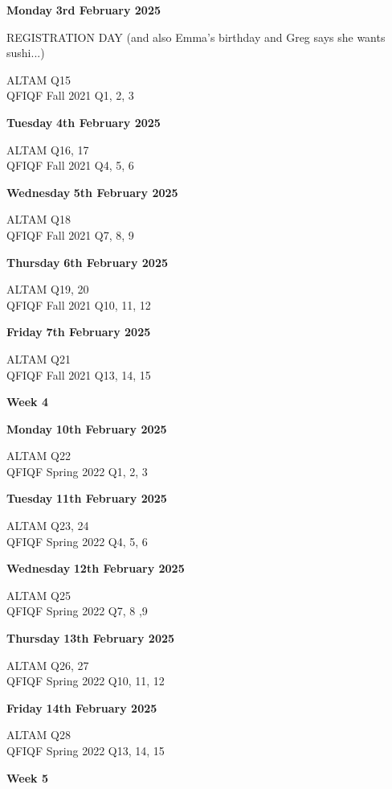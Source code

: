 \documentclass[hidelinks, 12pt]{article}
\theoremstyle{mydefstyle}
\theoremstyle{mythmstyle}
\begin{document}
\textbf{Monday} \hfill \textbf{3rd February 2025}

REGISTRATION DAY (and also Emma's birthday and Greg says she wants sushi...)

ALTAM Q15 \\
QFIQF Fall 2021 Q1, 2, 3

\textbf{Tuesday} \hfill \textbf{4th February 2025}

ALTAM Q16, 17 \\
QFIQF Fall 2021 Q4, 5, 6

\textbf{Wednesday} \hfill \textbf{5th February 2025}

ALTAM Q18 \\
QFIQF Fall 2021 Q7, 8, 9

\textbf{Thursday} \hfill \textbf{6th February 2025}

ALTAM Q19, 20 \\
QFIQF Fall 2021 Q10, 11, 12

\textbf{Friday} \hfill \textbf{7th February 2025}

ALTAM Q21 \\
QFIQF Fall 2021 Q13, 14, 15

\begin{center}
\textbf{Week 4}
\end{center}

\textbf{Monday} \hfill \textbf{10th February 2025}

ALTAM Q22 \\
QFIQF Spring 2022 Q1, 2, 3

\textbf{Tuesday} \hfill \textbf{11th February 2025}

ALTAM Q23, 24 \\
QFIQF Spring 2022 Q4, 5, 6

\textbf{Wednesday} \hfill \textbf{12th February 2025}

ALTAM Q25 \\
QFIQF Spring 2022 Q7, 8 ,9

\textbf{Thursday} \hfill \textbf{13th February 2025}

ALTAM Q26, 27 \\
QFIQF Spring 2022 Q10, 11, 12

\textbf{Friday} \hfill \textbf{14th February 2025}

ALTAM Q28 \\
QFIQF Spring 2022 Q13, 14, 15

\begin{center}
\textbf{Week 5}
\end{center}
\end{document}
